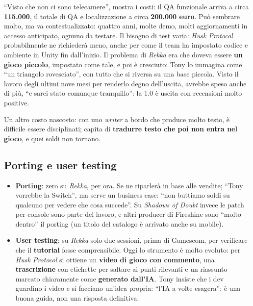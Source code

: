 ``Visto che non ci sono telecamere'', mostra i costi: il QA funzionale arriva a
circa \textbf{115.000}, il totale di QA e localizzazione a circa \textbf{200.000
euro}. Può sembrare molto, ma va contestualizzato: quattro anni, molte demo, molti
aggiornamenti in accesso anticipato, ognuno da testare. Il bisogno di test varia:
\emph{Husk Protocol} probabilmente ne richiederà meno, anche per come il team ha
impostato codice e ambiente in Unity fin dall'inizio. Il problema di \emph{Rekka}
era che doveva essere \textbf{un gioco piccolo}, impostato come tale, e poi è
cresciuto: Tony lo immagina come ``un triangolo rovesciato'', con tutto che si
riversa su una base piccola. Visto il lavoro degli ultimi nove mesi per renderlo
degno dell'uscita, avrebbe speso anche di più, ``e sarei stato comunque
tranquillo'': la 1.0 è uscita con recensioni molto positive.

Un altro costo nascosto: con uno \emph{writer} a bordo che produce molto testo, è
difficile essere disciplinati; capita di \textbf{tradurre testo che poi non entra
nel gioco}, e quei soldi non tornano.

\subsection{Porting e user testing}

\begin{itemize}
  \item \textbf{Porting}: zero su \emph{Rekka}, per ora. Se ne riparlerà in base
        alle vendite; ``Tony vorrebbe la Switch'', ma serve un business case:
        ``non buttiamo soldi su qualcuno per vedere che cosa succede''. Su
        \emph{Shadows of Doubt} invece le patch per console sono parte del lavoro,
        e altri producer di Fireshine sono ``molto dentro'' il porting (un titolo
        del catalogo è arrivato anche su mobile).
  \item \textbf{User testing}: su \emph{Rekka} solo due sessioni, prima di
        Gamescom, per verificare che il \textbf{tutorial} fosse comprensibile.
        Oggi lo strumento è molto evoluto: per \emph{Husk Protocol} si ottiene un
        \textbf{video di gioco con commento}, una \textbf{trascrizione} con
        etichette per saltare ai punti rilevanti e un riassunto marcato
        chiaramente come \textbf{generato dall'IA}. Tony insiste che i dev guardino
        i video e si facciano un'idea propria: ``l'IA a volte esagera''; è una buona
        guida, non una risposta definitiva.
\end{itemize}

